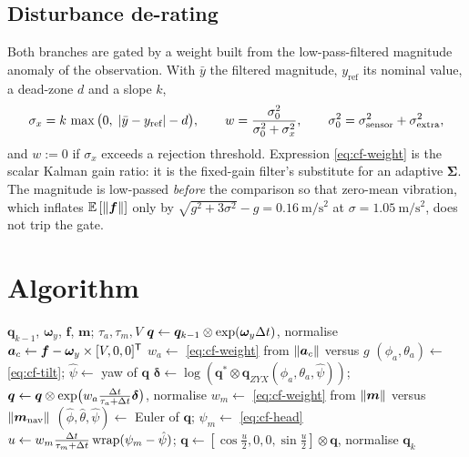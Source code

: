 \subsection{Disturbance de-rating}
Both branches are gated by a weight built from the low-pass-filtered magnitude anomaly of the
observation. With $\bar{y}$ the filtered magnitude, $y_{\text{ref}}$ its nominal value, a dead-zone
$d$ and a slope $k$,
\begin{equation}
\sigma_x = k\,\max\big(0,\;\left\lvert \bar{y}-y_{\text{ref}} \right\rvert-d\big),\qquad
w = \frac{\sigma_0^2}{\sigma_0^2+\sigma_x^2},\qquad
\sigma_0^2=\sigma_{\text{sensor}}^2+\sigma_{\text{extra}}^2,
\label{eq:cf-weight}
\end{equation}
and $w\!:=\!0$ if $\sigma_x$ exceeds a rejection threshold. Expression \eqref{eq:cf-weight} is the
scalar Kalman gain ratio: it is the fixed-gain filter's substitute for an adaptive $\bm{\Sigma}$.
The magnitude is low-passed \emph{before} the comparison so that zero-mean vibration, which inflates
$\mathbb{E}\left[\left\lVert \bm{f} \right\rVert\right]$ only by $\sqrt{g^2+3\sigma^2}-g=\SI{0.16}{\metre\per\second\squared}$ at
$\sigma=\SI{1.05}{\metre\per\second\squared}$, does not trip the gate.

\section{Algorithm}
\begin{algorithm}[H]
\caption{Complementary --- one sampling period ($\dt=\SI{10}{\milli\second}$)}
\begin{algorithmic}[1]
\Require $\bm{q}_{k-1}$, $\bm{\omega}_y$, $\bm{f}$, $\bm{m}$; $\tau_a,\tau_m,V$
\State $\bm{q}\gets\bm{q}_{k-1}\otimes\exp(\bm{\omega}_y\Delta t)$, normalise 
\State $\bm{a}_c\gets\bm{f}-\bm{\omega}_y\times[V,0,0]^{\mathsf{T}}$ 
\State $w_a\gets$ \eqref{eq:cf-weight} from $\left\lVert \bm{a}_c \right\rVert$ versus $g$
  \State $(\phi_a,\theta_a)\gets$ \eqref{eq:cf-tilt}; \; $\hat\psi\gets$ yaw of $\bm{q}$
  \State $\bm{\delta}\gets\log(\bm{q}^*\otimes\bm{q}_{ZYX}(\phi_a,\theta_a,\hat\psi))$; \;
         $\bm{q}\gets\bm{q}\otimes\exp\!\big(w_a\tfrac{\Delta t}{\tau_a+\Delta t}\bm{\delta}\big)$, normalise
\EndIf
\State $w_m\gets$ \eqref{eq:cf-weight} from $\left\lVert \bm{m} \right\rVert$ versus $\left\lVert \bm{m}_{\text{nav}} \right\rVert$
  \State $(\hat\phi,\hat\theta,\hat\psi)\gets$ Euler of $\bm{q}$; \; $\psi_m\gets$ \eqref{eq:cf-head}
  \State $u\gets w_m\tfrac{\Delta t}{\tau_m+\Delta t}\operatorname{wrap}(\psi_m-\hat\psi)$;\;
         $\bm{q}\gets[\cos\frac{u}{2},0,0,\sin\frac{u}{2}]\otimes\bm{q}$, normalise
\EndIf
\Ensure $\bm{q}_k$
\end{algorithmic}
\end{algorithm}

